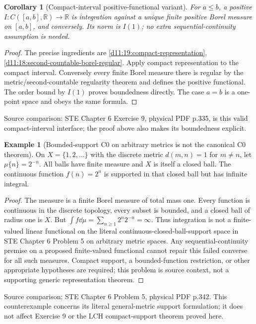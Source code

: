 \documentclass[11pt,oneside,openany]{book}
\newtheorem{corollary}[theorem]{Corollary}
\theoremstyle{definition}
\newtheorem{example}[theorem]{Example}
\theoremstyle{remark}
\newcommand{\R}{\mathbb R}\newcommand{\C}{\mathbb C}
\newcommand{\family}[1]{}
\newcommand{\source}[1]{\par\begingroup\small\sffamily\color{black!65}Source comparison: #1\par\endgroup}
\begin{document}
\begin{corollary}[Compact-interval positive-functional variant]\family{D11.19.stein_exercise9_interface}\label{d11:19:stein-exercise9-interface}
For $a\le b$, a positive $I:C([a,b],\R)\to\R$ is integration against a unique finite positive Borel measure on $[a,b]$, and conversely. Its norm is $I(1)$; no extra sequential-continuity assumption is needed.
\end{corollary}
\begin{proof}
The precise ingredients are \cref{d11:19:compact-representation}, \cref{d11:18:second-countable-borel-regular}. Apply compact representation to the compact interval. Conversely every finite Borel measure there is regular by the metric/second-countable regularity theorem and defines the positive functional. The order bound by $I(1)$ proves boundedness directly. The case $a=b$ is a one-point space and obeys the same formula.
\end{proof}
\source{STE Chapter 6 Exercise 9, physical PDF p.335, is this valid compact-interval interface; the proof above also makes its boundedness explicit.}

\begin{example}[Bounded-support C0 on arbitrary metrics is not the canonical C0 theorem]\family{D11.19.stein_problem5_caution}\label{d11:19:stein-problem5-caution}
On $X=\{1,2,\ldots\}$ with the discrete metric $d(m,n)=1$ for $m\ne n$, let $\mu\{n\}=2^{-n}$. All balls have finite measure and $X$ is itself a closed ball. The continuous function $f(n)=2^n$ is supported in that closed ball but has infinite integral.
\end{example}
\begin{proof}
The measure is a finite Borel measure of total mass one. Every function is continuous in the discrete topology, every subset is bounded, and a closed ball of radius one is $X$. But $\int f\dd\mu=\sum_{n\ge1}2^n2^{-n}=\infty$. Thus integration is not a finite-valued linear functional on the literal continuous-closed-ball-support space in STE Chapter 6 Problem 5 on arbitrary metric spaces. Any sequential-continuity premise on a proposed finite-valued functional cannot repair this failed converse for all such measures. Compact support, a bounded-function restriction, or other appropriate hypotheses are required; this problem is source context, not a supporting generic representation theorem.
\end{proof}
\source{STE Chapter 6 Problem 5, physical PDF p.342. This counterexample concerns its literal general-metric support formulation; it does not affect Exercise 9 or the LCH compact-support theorem proved here.}
\end{document}
